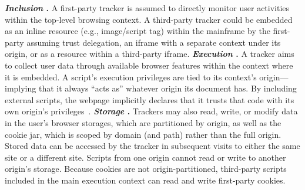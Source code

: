 %
%
%
%
\textbf{\textit{Inclusion} \symInclusion.}
%
A first-party tracker is assumed to directly monitor user activities within the top-level browsing context.
%
A third-party tracker could be embedded as an inline resource (e.g., image/script tag) within the mainframe by the first-party assuming trust delegation, an iframe with a separate context under its origin, or as a resource within a third-party iframe.
%
\textbf{\textit{Execution} \symExecution.}
%
A tracker aims to collect user data through available browser features 
within the context where it is embedded. 
%
A script's execution privileges are tied to its context’s origin---implying that it always ``acts as'' whatever origin its document has.
%
%
%
By including external scripts, the webpage implicitly declares that it trusts that code with its own origin’s privileges~\cite{TrackingPreventionWebKit2020}.
%
\textbf{\textit{Storage} \symStorage.}
%
Trackers may also read, write, or modify data in the user's browser storages,
which are partitioned by origin, as well as the cookie jar, which is scoped by domain (and path) rather than the full origin.
%
Stored data can be accessed by the tracker in subsequent visits to either the same site or a different site.
%
Scripts from one origin cannot read or write to another origin’s storage.
%
Because cookies are not origin-partitioned, third-party scripts included in the main execution context can read and write first-party cookies.
